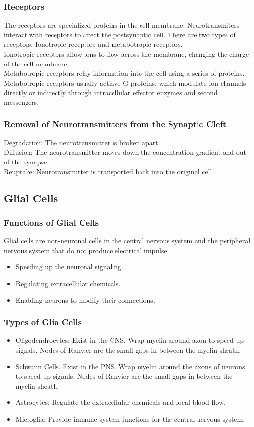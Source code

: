 \subsubsection{Receptors}
The receptors are specialized proteins in the cell membrane. Neurotransmiters interact with receptors to affect the postsynaptic cell. There are two types of receptors: Ionotropic receptors and metabotropic receptors.
\\Ionotropic receptors allow ions to flow across the membrane, changing the charge of the cell membrane.
\\Metabotropic receptors relay information into the cell using a series of proteins. Metabotropic receptors usually actiave G-proteins, which modulate ion channels directly or indirectly through intracellular effector enzymes and second messengers.
\subsubsection{Removal of Neurotransmitters from the Synaptic Cleft}
Degradation: The neurotransmitter is broken apart.
\\Diffusion: The neurotransmitter moves down the concentration gradient and out of the synapse.
\\Reuptake: Neurotransmitter is transported back into the original cell.

\subsection{Glial Cells}
\subsubsection{Functions of Glial Cells}
Glial cells are non-neuronal cells in the central nervous system and the peripheral nervous system that do not produce electrical impulse.
\begin{itemize}
    \item Speeding up the neuronal signaling.
    \item Regulating extracellular chemicals.
    \item Enabling neurons to modify their connections.
\end{itemize}

\subsubsection{Types of Glia Cells}
\begin{itemize}
    \item Oligodendrocytes: Exist in the CNS. Wrap myelin around axon to speed up signals. Nodes of Ranvier are the small gaps in between the myelin sheath.
    \item Schwann Cells. Exist in the PNS. Wrap myelin around the axons of neurons to speed up signals. Nodes of Ranvier are the small gaps in between the myelin sheath.
    \item Astrocytes: Regulate the extracellular chemicals and local blood flow.
    \item Microglia: Provide immune system functions for the central nervous system.
\end{itemize}

